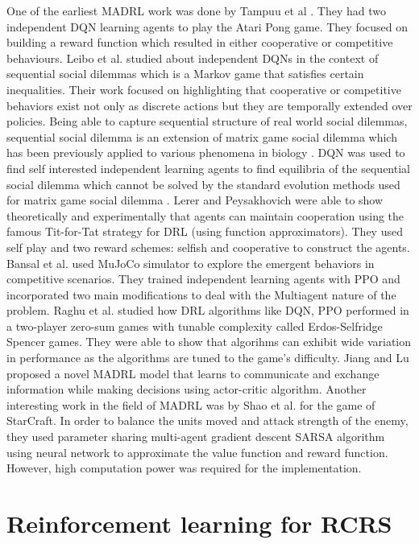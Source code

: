 \documentclass[12pt]{report}
\begin{document}
One of the earliest MADRL work was done by Tampuu et al \cite{Tampuu}. They had two independent DQN learning agents to play the Atari Pong game. They focused on building a reward function which resulted in either cooperative or competitive behaviours. Leibo et al. \cite{Leibo} studied about independent DQNs in the context of sequential social dilemmas which is a Markov game that satisfies certain inequalities. Their work focused on highlighting that cooperative or competitive behaviors exist not only as discrete actions but they are temporally extended over policies. Being able to capture sequential structure of real world social dilemmas, sequential social dilemma is an extension of matrix game social dilemma which has been previously applied to various phenomena in biology \cite{Cote}. DQN was used to find self interested independent learning agents to find equilibria of the sequential social dilemma which cannot be solved by the standard evolution methods used for matrix game social dilemma \cite{Weiner}. Lerer and Peysakhovich \cite{Lerer} were able to show theoretically and experimentally that agents can maintain cooperation using the famous Tit-for-Tat strategy for DRL (using function approximators). They used self play and two reward schemes: selfish and cooperative to construct the agents. Bansal et al. \cite{Bansal} used MuJoCo simulator to explore the emergent behaviors in competitive scenarios. They trained independent learning agents with PPO and incorporated two main modifications to deal with the Multiagent nature of the problem. Raghu et al. \cite{Raghu} studied how DRL algorithms like DQN, PPO performed in a two-player zero-sum games with tunable complexity called Erdos-Selfridge Spencer games. They were able to show that algorihms can exhibit wide variation in performance as the algorithms are tuned to the game's difficulty. Jiang and Lu \cite{Jiang} proposed a novel MADRL model that learns to communicate and exchange information while making decisions using actor-critic algorithm. Another interesting work in the field of MADRL was by Shao et al. \cite{Shao} for the game of StarCraft. In order to balance the units moved and attack strength of the enemy, they used parameter sharing multi-agent gradient descent SARSA algorithm using neural network to approximate the value function and reward function. However, high computation power was required for the implementation. 

\section{Reinforcement learning for RCRS}
\end{document}
